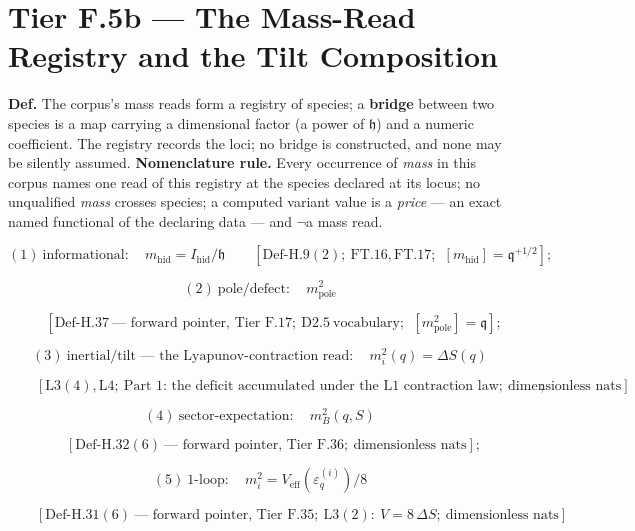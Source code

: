 \section[Tier F.5b — The Mass-Read Registry and the Tilt Composition]{\texorpdfstring{Tier F.5b — The Mass-Read Registry and the Tilt Composition}{Tier F.5b - The Mass-Read Registry and the Tilt Composition}}

\begin{definition}\label{tag:Def-H-39}
\textbf{Def.} The corpus's mass reads form a registry of species; a \textbf{bridge} between two species is a map carrying a dimensional factor (a power of $\mathfrak h$) and a numeric coefficient. The registry records the loci; no bridge is constructed, and none may be silently assumed. \textbf{Nomenclature rule.} Every occurrence of \textit{mass} in this corpus names one read of this registry at the species declared at its locus; no unqualified \textit{mass} crosses species; a computed variant value is a \textit{price} — an exact named functional of the declaring data — and $\neg$a mass read.

\[
(1)\ \text{informational}:\quad m_{\mathrm{hid}}=I_{\mathrm{hid}}/\mathfrak h\qquad[\mathrm{Def\text{-}H.9}(2);\ \mathrm{FT.16},\mathrm{FT.17};\ \ [m_{\mathrm{hid}}]=\mathfrak q^{+1/2}];
\]

\[
(2)\ \text{pole/defect}:\quad m^2_{\mathrm{pole}}
\]

\[
\qquad [\mathrm{Def\text{-}H.37}\ \text{— forward pointer, Tier F.17};\ \mathrm{D2.5}\ \text{vocabulary};\ \ [m^2_{\mathrm{pole}}]=\mathfrak q];
\]

\[
(3)\ \text{inertial/tilt — the Lyapunov-contraction read}:\quad m_i^2(q)=\Delta S(q)
\]

\[
\qquad [\mathrm{L3}(4),\mathrm{L4};\ \text{Part 1: the deficit accumulated under the L1 contraction law};\ \text{dimensionless nats}];
\]

\[
(4)\ \text{sector-expectation}:\quad m^2_B(q,S)
\]

\[
\qquad [\mathrm{Def\text{-}H.32}(6)\ \text{— forward pointer, Tier F.36};\ \text{dimensionless nats}];
\]

\[
(5)\ \text{1-loop}:\quad m_i^2=V_{\mathrm{eff}}(\varepsilon_q^{(i)})/8
\]

\[
\qquad [\mathrm{Def\text{-}H.31}(6)\ \text{— forward pointer, Tier F.35};\ \mathrm{L3}(2):\ V=8\,\Delta S;\ \text{dimensionless nats}].
\]


\end{definition}
